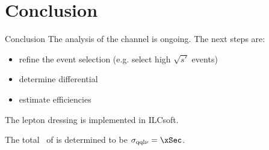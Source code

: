 
\section{Conclusion}

\begin{frame}{Conclusion}
The analysis of the \eeto\qqln channel is ongoing. The next steps are:
\begin{itemize}
\item refine the event selection (e.g. select high $\sqrt{s'}$ events)
\item determine differential 
\item estimate efficiencies
\end{itemize}

\vspace{1em}
The lepton dressing is implemented in ILCsoft.

\vspace{1em}
The total \xsec\ of \eeto\qqln is determined to be $\sigma_\mathrm{\qqln} = \xSec$.


\vspace{1em}
\end{frame}
